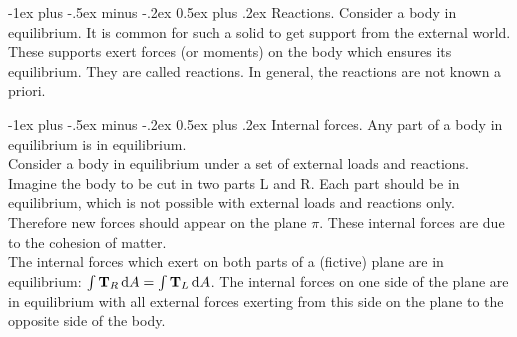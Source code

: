 \documentclass[10pt,landscape,a4paper]{article}
\makeatletter
\renewcommand\d{\mathop{}\!\mathrm{d}}
\renewcommand{\section}{\@startsection{section}{1}{0mm}%
	{-1ex plus -.5ex minus -.2ex}%
	{0.5ex plus .2ex}%
	{\normalfont\large\bfseries}}
\makeatother
\begin{document}
\begin{multicols}{3}
		\section{Reactions.}
		Consider a body in equilibrium.
		It is common for such a solid to get support from the external world.
		These supports exert forces (or moments) on the body which ensures its equilibrium.
		They are called reactions.
		In general, the reactions are not known a priori.
		
		\section{Internal forces.}
		Any part of a body in equilibrium is in equilibrium.\\
		Consider a body in equilibrium under a set of external loads and reactions.
		Imagine the body to be cut in two parts L and R.
		Each part should be in equilibrium, which is not possible with external loads and reactions only.
		Therefore new forces should appear on the plane $ \pi $.
		These internal forces are due to the cohesion of matter.\\
		The internal forces which exert on both parts of a (fictive) plane are in equilibrium: $ \int{\vb{T}_R\d A} = \int{\vb{T}_L\d A} $.
		The internal forces on one side of the plane are in equilibrium with all external forces exerting from this side on the plane to the opposite side of the body.
		

\end{multicols}
\end{document}
